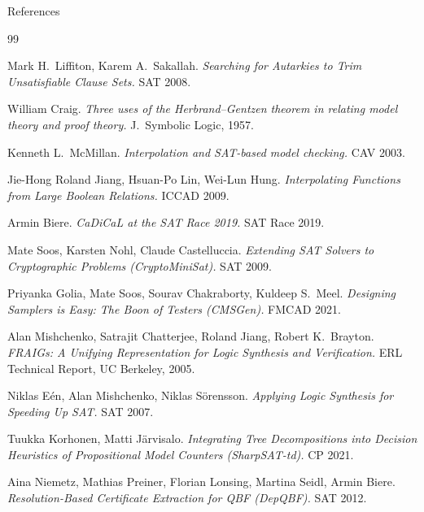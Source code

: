 \documentclass[aspectratio=169]{beamer}
\begin{document}
\begin{frame}[allowframebreaks]{References}
  \scriptsize
  \begin{thebibliography}{99}

     Mark H.\ Liffiton, Karem A.\ Sakallah.
      \emph{Searching for Autarkies to Trim Unsatisfiable Clause Sets.}
      SAT 2008.

     William Craig.
      \emph{Three uses of the Herbrand–Gentzen theorem in relating model
      theory and proof theory.}  J.\ Symbolic Logic, 1957.

     Kenneth L.\ McMillan.
      \emph{Interpolation and SAT-based model checking.}  CAV 2003.

     Jie-Hong Roland Jiang, Hsuan-Po Lin,
      Wei-Lun Hung.
      \emph{Interpolating Functions from Large Boolean Relations.}
      ICCAD 2009.

     Armin Biere.
      \emph{CaDiCaL at the SAT Race 2019.}
      SAT Race 2019.

     Mate Soos, Karsten Nohl,
      Claude Castelluccia.
      \emph{Extending SAT Solvers to Cryptographic Problems
      (CryptoMiniSat).}  SAT 2009.

     Priyanka Golia, Mate Soos, Sourav Chakraborty,
      Kuldeep S.\ Meel.
      \emph{Designing Samplers is Easy: The Boon of Testers (CMSGen).}
      FMCAD 2021.

     Alan Mishchenko, Satrajit Chatterjee,
      Roland Jiang, Robert K.\ Brayton.
      \emph{FRAIGs: A Unifying Representation for Logic Synthesis and
      Verification.}  ERL Technical Report, UC Berkeley, 2005.

     Niklas Eén, Alan Mishchenko, Niklas Sörensson.
      \emph{Applying Logic Synthesis for Speeding Up SAT.}  SAT 2007.

     Tuukka Korhonen, Matti Järvisalo.
      \emph{Integrating Tree Decompositions into Decision Heuristics of
      Propositional Model Counters (SharpSAT-td).}  CP 2021.

     Aina Niemetz, Mathias Preiner, Florian Lonsing,
      Martina Seidl, Armin Biere.
      \emph{Resolution-Based Certificate Extraction for QBF (DepQBF).}
      SAT 2012.


\end{thebibliography}
\end{frame}
\end{document}
